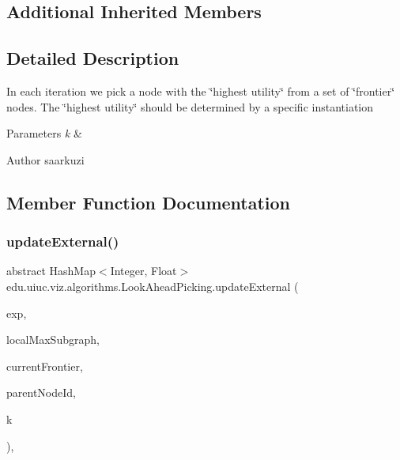 \subsection*{Additional Inherited Members}


\subsection{Detailed Description}
In each iteration we pick a node with the \char`\"{}highest utility\char`\"{} from a set of \char`\"{}frontier\char`\"{} nodes. The \char`\"{}highest utility\char`\"{} should be determined by a specific instantiation


\begin{DoxyParams}{Parameters}
{\em k} & \\
\hline
\end{DoxyParams}
\begin{DoxyAuthor}{Author}
saarkuzi 
\end{DoxyAuthor}


\subsection{Member Function Documentation}
\mbox{\label{classedu_1_1uiuc_1_1viz_1_1algorithms_1_1_look_ahead_picking_a5ba9a735d4038044011f64928225fb1d}} 
\subsubsection{\texorpdfstring{updateExternal()}{updateExternal()}}
{\footnotesize\ttfamily abstract Hash\+Map$<$Integer, Float$>$ edu.\+uiuc.\+viz.\+algorithms.\+Look\+Ahead\+Picking.\+update\+External (\begin{DoxyParamCaption}\item[{\mbox{\hyperlink{classedu_1_1uiuc_1_1viz_1_1algorithms_1_1_experiment}{Experiment}}}]{exp,  }\item[{Array\+List$<$ Integer $>$}]{local\+Max\+Subgraph,  }\item[{Hash\+Map$<$ Integer, Float $>$}]{current\+Frontier,  }\item[{Integer}]{parent\+Node\+Id,  }\item[{Integer}]{k }\end{DoxyParamCaption})\hspace{0.3cm}{\ttfamily [abstract]}, {\ttfamily [protected]}}

